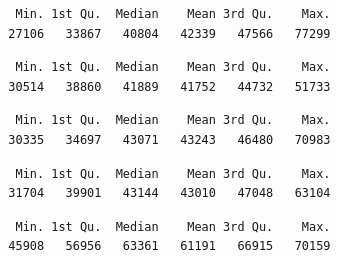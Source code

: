 \documentclass[
  us-letterpaper,
]{scrreprt}
\newenvironment{Shaded}{\begin{snugshade}}{\end{snugshade}}
\newcommand{\FunctionTok}[1]{\textcolor[rgb]{0.28,0.35,0.67}{#1}}
\newcommand{\NormalTok}[1]{\textcolor[rgb]{0.00,0.23,0.31}{#1}}
\newcommand{\SpecialCharTok}[1]{\textcolor[rgb]{0.37,0.37,0.37}{#1}}
\theoremstyle{definition}
\theoremstyle{plain}
\theoremstyle{plain}
\theoremstyle{remark}
\begin{document}
\begin{verbatim}
   Min. 1st Qu.  Median    Mean 3rd Qu.    Max. 
  27106   33867   40804   42339   47566   77299 
\end{verbatim}

\begin{Shaded}
\end{Shaded}

\begin{verbatim}
   Min. 1st Qu.  Median    Mean 3rd Qu.    Max. 
  30514   38860   41889   41752   44732   51733 
\end{verbatim}

\begin{Shaded}
\end{Shaded}

\begin{verbatim}
   Min. 1st Qu.  Median    Mean 3rd Qu.    Max. 
  30335   34697   43071   43243   46480   70983 
\end{verbatim}

\begin{Shaded}
\end{Shaded}

\begin{verbatim}
   Min. 1st Qu.  Median    Mean 3rd Qu.    Max. 
  31704   39901   43144   43010   47048   63104 
\end{verbatim}

\begin{Shaded}
\end{Shaded}

\begin{verbatim}
   Min. 1st Qu.  Median    Mean 3rd Qu.    Max. 
  45908   56956   63361   61191   66915   70159 
\end{verbatim}
\end{document}
